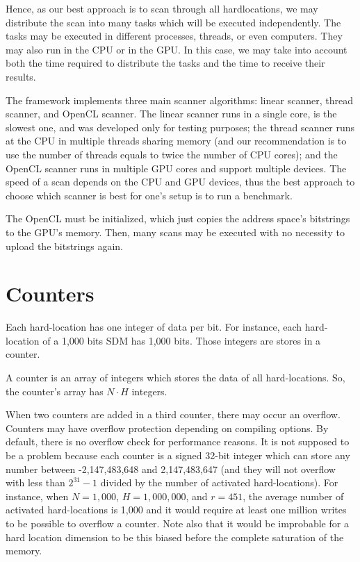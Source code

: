 Hence, as our best approach is to scan through all hardlocations, we may distribute the scan into many tasks which will be executed independently. The tasks may be executed in different processes, threads, or even computers. They may also run in the CPU or in the GPU. In this case, we may take into account both the time required to distribute the tasks and the time to receive their results.

The framework implements three main scanner algorithms: linear scanner, thread scanner, and OpenCL scanner. The linear scanner runs in a single core, is the slowest one, and was developed only for testing purposes; the thread scanner runs at the CPU in multiple threads sharing memory (and our recommendation is to use the number of threads equals to twice the number of CPU cores); and the OpenCL scanner runs in multiple GPU cores and support multiple devices. The speed of a scan depends on the CPU and GPU devices, thus the best approach to choose which scanner is best for one's setup is to run a benchmark.

The OpenCL must be initialized, which just copies the address space's bitstrings to the GPU's memory. Then, many scans may be executed with no necessity to upload the bitstrings again.


\section{Counters}

Each hard-location has one integer of data per bit. For instance, each hard-location of a 1,000 bits SDM has 1,000 bits. Those integers are stores in a counter.

A counter is an array of integers which stores the data of all hard-locations. So, the counter's array has $N \cdot H$ integers.

When two counters are added in a third counter, there may occur an overflow. Counters may have overflow protection depending on compiling options. By default, there is no overflow check for performance reasons. It is not supposed to be a problem because each counter is a signed 32-bit integer which can store any number between -2,147,483,648 and 2,147,483,647 (and they will not overflow with less than $2^{31}-1$ divided by the number of activated hard-locations). For instance, when $N=1,000$, $H=1,000,000$, and $r=451$, the average number of activated hard-locations is 1,000 and it would require at least one million writes to be possible to overflow a counter.  Note also that it would be improbable for a hard location dimension to be this biased before the complete saturation of the memory.


